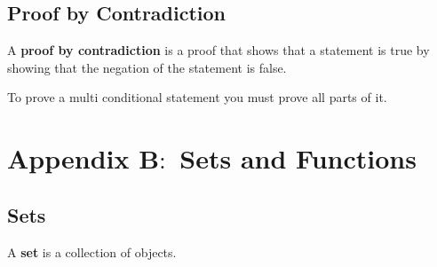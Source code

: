 \documentclass{article}
\begin{document}
\subsection*{Proof by Contradiction}
A \textbf{proof by contradiction} is a proof that shows that a statement is true by showing that the negation of the statement is false.

To prove a multi conditional statement you must prove all parts of it.

\newpage
\section{Appendix B$\colon$ Sets and Functions}
\subsection*{Sets}
A \textbf{set} is a collection of objects.
\end{document}
